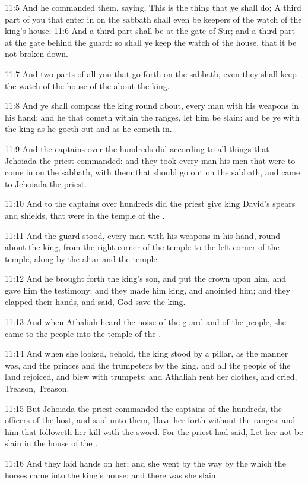 11:5 And he commanded them, saying, This is the thing that ye shall
do; A third part of you that enter in on the sabbath shall even be
keepers of the watch of the king's house; 11:6 And a third part shall
be at the gate of Sur; and a third part at the gate behind the guard:
so shall ye keep the watch of the house, that it be not broken down.

11:7 And two parts of all you that go forth on the sabbath, even they
shall keep the watch of the house of the \LORD about the king.

11:8 And ye shall compass the king round about, every man with his
weapons in his hand: and he that cometh within the ranges, let him be
slain: and be ye with the king as he goeth out and as he cometh in.

11:9 And the captains over the hundreds did according to all things
that Jehoiada the priest commanded: and they took every man his men
that were to come in on the sabbath, with them that should go out on
the sabbath, and came to Jehoiada the priest.

11:10 And to the captains over hundreds did the priest give king
David's spears and shields, that were in the temple of the \LORD.

11:11 And the guard stood, every man with his weapons in his hand,
round about the king, from the right corner of the temple to the left
corner of the temple, along by the altar and the temple.

11:12 And he brought forth the king's son, and put the crown upon him,
and gave him the testimony; and they made him king, and anointed him;
and they clapped their hands, and said, God save the king.

11:13 And when Athaliah heard the noise of the guard and of the
people, she came to the people into the temple of the \LORD.

11:14 And when she looked, behold, the king stood by a pillar, as the
manner was, and the princes and the trumpeters by the king, and all
the people of the land rejoiced, and blew with trumpets: and Athaliah
rent her clothes, and cried, Treason, Treason.

11:15 But Jehoiada the priest commanded the captains of the hundreds,
the officers of the host, and said unto them, Have her forth without
the ranges: and him that followeth her kill with the sword. For the
priest had said, Let her not be slain in the house of the \LORD.

11:16 And they laid hands on her; and she went by the way by the which
the horses came into the king's house: and there was she slain.

